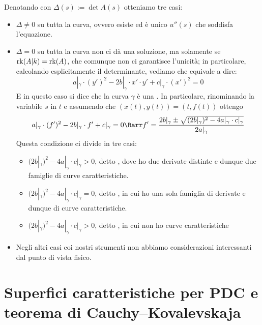 \documentclass{article}
\begin{document}
Denotando con $\Delta(s) := \det A(s)$ otteniamo tre casi:\begin{itemize}
    \item $\Delta \neq 0$ su tutta la curva, ovvero esiste ed è unico $u''(s)$ che soddisfa l'equazione.
    \item $\Delta = 0$ su tutta la curva  non ci dà una soluzione, ma solamente se $\operatorname{rk}(A|k) = \operatorname{rk}(A)$, che comunque non ci garantisce l'unicità; in particolare, calcolando esplicitamente il determinante, vediamo che equivale a dire:
    \[ a|_\gamma \cdot (y')^2 - 2b|_\gamma \cdot x' \cdot y' + c|_\gamma \cdot (x')^2=0  \]
    E in questo caso si dice che la curva $\gamma$ è una . In particolare, rinominando la variabile $s$ in $t$ e assumendo che  $(x(t),y(t)) = (t, f(t))$ ottengo 
    \[ a|_\gamma \cdot (f')^2 - 2b|_\gamma \cdot f' + c|_\gamma =0 \Rarr f' = \frac{ 2b|_\gamma \pm \sqrt{(2b|_\gamma)^2 - 4 a|_\gamma \cdot c|_\gamma} }{2a|_\gamma} \]
    Questa condizione ci divide in tre casi:\begin{itemize}
        \item $(2b|_\gamma)^2 - 4 a|_\gamma \cdot c|_\gamma > 0$, detto , dove ho due derivate distinte e dunque due famiglie di curve caratteristiche.
        \item $(2b|_\gamma)^2 - 4 a|_\gamma \cdot c|_\gamma = 0$, detto , in cui ho una sola famiglia di derivate e dunque di curve caratteristiche.
        \item $(2b|_\gamma)^2 - 4 a|_\gamma \cdot c|_\gamma > 0$, detto , in cui non ho curve caratteristiche
    \end{itemize}
    \item Negli altri casi coi nostri strumenti non abbiamo considerazioni interessanti dal punto di vista fisico.
\end{itemize}

\section{Superfici caratteristiche per PDC e teorema di Cauchy--Kovalevskaja}
\end{document}
